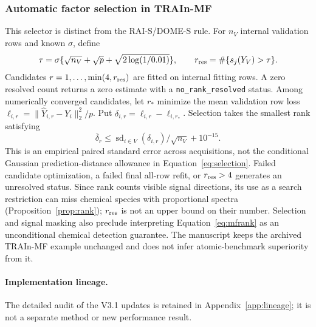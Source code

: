 \subsubsection{Automatic factor selection in TRAIn-MF}
This selector is distinct from the RAI-S/DOME-S rule. For $n_V$ internal validation rows and known $\sigma$, define
\begin{equation}\label{eq:mfrank}
 \tau=\sigma\{\sqrt{n_V}+\sqrt p+\sqrt{2\log(1/0.01)}\},\qquad
 r_{\rm res}=\#\{s_j(Y_V)>\tau\}.
\end{equation}
Candidates $r=1,\ldots,\min(4,r_{\rm res})$ are fitted on internal fitting rows. A zero resolved count returns a zero estimate with a \texttt{no\_rank\_resolved} status. Among numerically converged candidates, let $r_*$ minimize the mean validation row loss $\ell_{i,r}=\|\widehat Y_{i,r}-Y_i\|_2^2/p$. Put $\delta_{i,r}=\ell_{i,r}-\ell_{i,r_*}$. Selection takes the smallest rank satisfying
\begin{equation}\label{eq:mfselect}
 \overline\delta_r\leq
 \operatorname{sd}_{i\in V}(\delta_{i,r})/\sqrt{n_V}+10^{-15}.
\end{equation}
This is an empirical paired standard error across acquisitions, not the conditional Gaussian prediction-distance allowance in Equation~\eqref{eq:selection}. Failed candidate optimization, a failed final all-row refit, or $r_{\rm res}>4$ generates an unresolved status. Since rank counts visible signal directions, its use as a search restriction can miss chemical species with proportional spectra (Proposition~\ref{prop:rank}); $r_{\rm res}$ is not an upper bound on their number. Selection and signal masking also preclude interpreting Equation~\eqref{eq:mfrank} as an unconditional chemical detection guarantee. The manuscript keeps the archived TRAIn-MF example unchanged and does not infer atomic-benchmark superiority from it.

\paragraph{Implementation lineage.} The detailed audit of the V3.1 updates is retained in Appendix~\ref{app:lineage}; it is not a separate method or new performance result.
